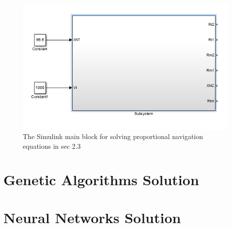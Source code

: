 \begin{figure}[htb]
	\centering
	\includegraphics[scale = 0.75]{fig/PNmainBlock.PNG}
	\caption{The Simulink main block for solving proportional navigation equations in sec 2.3}
	\label{PN main block}
\end{figure}


\section{Genetic Algorithms Solution}

\section{Neural Networks Solution}
